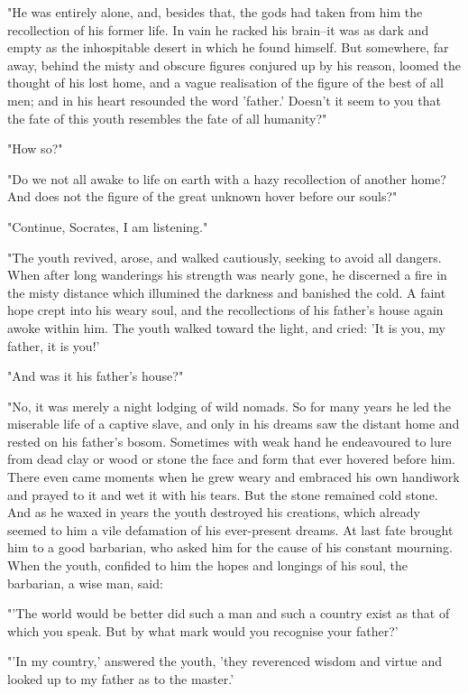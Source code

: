 "He was entirely alone, and, besides that, the gods had taken from him
the recollection of his former life. In vain he racked his brain--it
was as dark and empty as the inhospitable desert in which he found
himself. But somewhere, far away, behind the misty and obscure figures
conjured up by his reason, loomed the thought of his lost home, and a
vague realisation of the figure of the best of all men; and in his
heart resounded the word 'father.' Doesn't it seem to you that the
fate of this youth resembles the fate of all humanity?"

"How so?"

"Do we not all awake to life on earth with a hazy recollection of
another home? And does not the figure of the great unknown hover
before our souls?"

"Continue, Socrates, I am listening."

"The youth revived, arose, and walked cautiously, seeking to avoid all
dangers. When after long wanderings his strength was nearly gone, he
discerned a fire in the misty distance which illumined the darkness
and banished the cold. A faint hope crept into his weary soul, and the
recollections of his father's house again awoke within him. The youth
walked toward the light, and cried: 'It is you, my father, it is you!'

"And was it his father's house?"

"No, it was merely a night lodging of wild nomads. So for many years
he led the miserable life of a captive slave, and only in his dreams
saw the distant home and rested on his father's bosom. Sometimes with
weak hand he endeavoured to lure from dead clay or wood or stone the
face and form that ever hovered before him. There even came moments
when he grew weary and embraced his own handiwork and prayed to it and
wet it with his tears. But the stone remained cold stone. And as he
waxed in years the youth destroyed his creations, which already seemed
to him a vile defamation of his ever-present dreams. At last fate
brought him to a good barbarian, who asked him for the cause of his
constant mourning. When the youth, confided to him the hopes and
longings of his soul, the barbarian, a wise man, said:

"'The world would be better did such a man and such a country exist as
that of which you speak. But by what mark would you recognise your
father?'

"'In my country,' answered the youth, 'they reverenced wisdom and
virtue and looked up to my father as to the master.'

